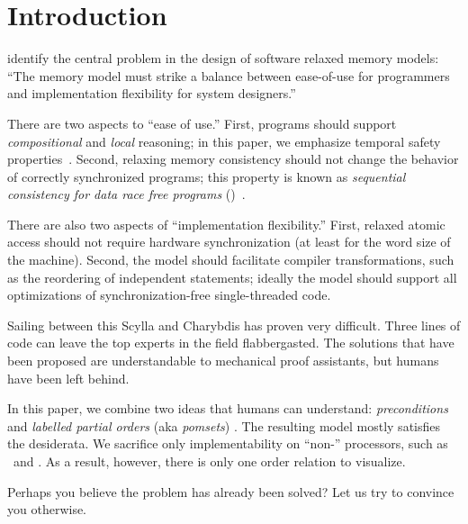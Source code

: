 \section{Introduction}
\label{sec:intro}
\citet{Manson:2005:JMM:1047659.1040336} identify the central problem in the
design of software relaxed memory models: ``The memory model must strike a
balance between ease-of-use for programmers and implementation flexibility
for system designers.''  

There are two aspects to ``ease of use.''  First, programs should support
\emph{compositional} and \emph{local} reasoning; in this paper, we emphasize
temporal safety
properties~\cite{PnueliSafety,Misra:1981:PNP:1313338.1313770,StarkSafety,Abadi:1993:CS:151646.151649}.
Second, relaxing memory consistency should not change the behavior of correctly
synchronized programs; this property is known as \emph{sequential consistency
  for data race free programs} (\drfsc)~\cite{DBLP:journals/tpds/AdveH93,
  DBLP:conf/isca/AdveH90}.

There are also two aspects of ``implementation flexibility.''  First, relaxed
atomic access should not require hardware synchronization (at least for the
word size of the machine).  Second, the model
should facilitate compiler transformations, such as the reordering of independent
statements; ideally the model should support all %
optimizations of
synchronization\hyp{}free single\hyp{}threaded code.

Sailing between this Scylla and Charybdis has proven very difficult.  Three
lines of code can leave the top experts in the field flabbergasted.  The
solutions that have been proposed are understandable to mechanical proof
assistants, but humans have been left behind.

In this paper, we combine two ideas that humans can understand: \emph{preconditions}
\cite{Hoare:1969:ABC:363235.363259} and \emph{labelled partial orders} (aka \emph{pomsets})
\cite{GISCHER1988199,Plotkin:1997:TSP:266557.266600}.  The resulting model
mostly satisfies the desiderata.  We sacrifice only implementability on
``non-\mca'' processors, such as \ppc\ and \armseven{}. As a result, however,
there is only one order relation to visualize.

Perhaps you believe the problem has already been solved?  Let us try to
convince you otherwise.

